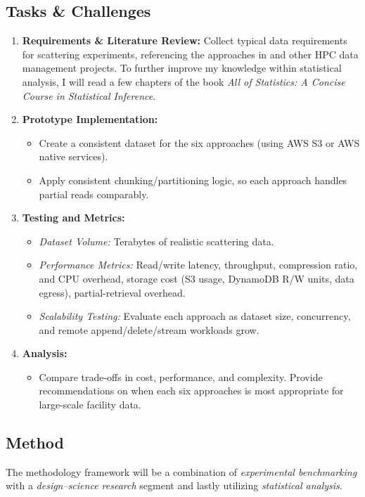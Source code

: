 \documentclass{article}
\begin{document}
\subsection{Tasks \& Challenges}
\begin{enumerate}
    \item \textbf{Requirements \& Literature Review:} 
    Collect typical data requirements for scattering experiments, referencing the approaches in \cite{wang2018synchrotron, meyer2014store, moriyama2019public, godoy2021efficient} and other HPC data management projects. To further improve my knowledge within statistical analysis, I will read a few chapters of the book \textit{All of Statistics: A Concise Course in Statistical Inference}. 
    \item \textbf{Prototype Implementation:}
        \begin{itemize}
            \item Create a consistent dataset for the six approaches (using AWS S3 or AWS native services).
            \item Apply consistent chunking/partitioning logic, so each approach handles partial reads comparably.
        \end{itemize}
    \item \textbf{Testing and Metrics:}
        \begin{itemize}
            \item \emph{Dataset Volume:} Terabytes of realistic scattering data.
            \item \emph{Performance Metrics:} Read/write latency, throughput, compression ratio, and CPU overhead, storage cost (S3 usage, DynamoDB R/W units, data egress), partial-retrieval overhead.
            \item \emph{Scalability Testing:} Evaluate each approach as dataset size, concurrency, and remote append/delete/stream workloads grow.
        \end{itemize}
    \item \textbf{Analysis:}
        \begin{itemize}
            \item Compare trade-offs in cost, performance, and complexity. Provide recommendations on when each six approaches is most appropriate for large-scale facility data.
        \end{itemize}
\end{enumerate}

\subsection{Method}
The methodology framework will be a combination of \emph{experimental benchmarking} with a \emph{design–science research} segment and lastly utilizing \emph{statistical analysis}.
\end{document}
